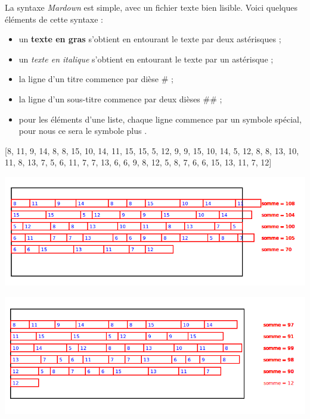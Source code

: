 \documentclass[12pt,class=report,crop=false]{standalone}
\begin{document}
\newcommand{\badletter}[1]{\underline{\textcolor{red}{#1}}}




{\large
La syntaxe \emph{Mardown} est simple, avec un fichier texte bien lisible. Voici quelques éléments de cette syntaxe :
\begin{itemize}
  \item un \textbf{texte en gras} s'obtient en entourant le texte par deux astérisques \ci{**} ;
  \item un \emph{texte en italique} s'obtient en entourant le texte par un astérisque \ci{*} ;
  \item la ligne d'un titre commence par dièse \# ;
  \item la ligne d'un sous-titre commence par deux dièses \#\# ;
  \item pour les éléments d'une liste, chaque ligne commence par un symbole spécial, pour nous ce sera le symbole \og{}plus\fg{} \ci{+}.
\end{itemize}
}

\newpage

\begin{center}
 [8, 11, 9, 14, 8, 8, 15, 10, 14, 11, 15, 15, 5, 12, 9, 9, 15, 10, 14, 5, 12, 8, 8, 13, 10, 11, 8, 13, 7, 5, 6, 11, 7, 7, 13, 6, 6, 9, 8, 12, 5, 8, 7, 6, 6, 15, 13, 11, 7, 12]
\end{center}

\begin{center}
\includegraphics[scale=0.6]{ecran-coupures-1}
\end{center} 


\newpage

  
\begin{center}
\includegraphics[scale=0.6]{ecran-coupures-2}
\end{center}
\end{document}
